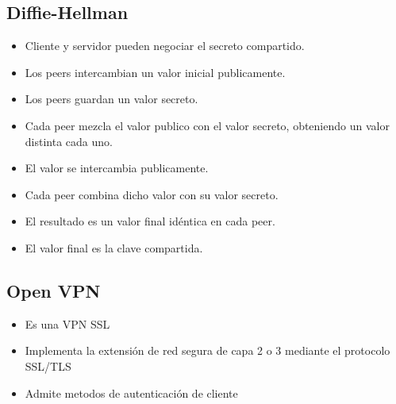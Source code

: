\documentclass[11pt]{article}
\begin{document}
\subsection{Diffie-Hellman}
\label{sec:org1997b29}
\begin{itemize}
\item Cliente y servidor pueden negociar el secreto compartido.

\item Los peers intercambian un valor inicial publicamente.
\item Los peers guardan un valor secreto.
\item Cada peer mezcla el valor publico con el valor secreto, obteniendo un valor distinta cada uno.
\item El valor se intercambia publicamente.
\item Cada peer combina dicho valor con su valor secreto.
\item El resultado es un valor final idéntica en cada peer.
\item El valor final es la clave compartida.
\end{itemize}
\subsection{Open VPN}
\label{sec:orgcfdda45}
\begin{itemize}
\item Es una VPN SSL
\item Implementa la extensión de red segura de capa 2 o 3 mediante el protocolo SSL/TLS
\item Admite metodos de autenticación de cliente
\end{itemize}
\end{document}
